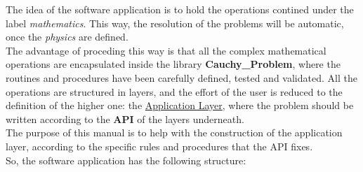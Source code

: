\vspace{1cm}

The idea of the software application is to hold the operations contined under
the label \textit{mathematics}. This way, the resolution of the problems will be
automatic, once the \textit{physics} are defined. \\

The advantage of proceding this way is that all the complex mathematical
operations are encapsulated inside the library \textbf{Cauchy\_Problem}, where
the routines and procedures have been carefully defined, tested and validated.
All the operations are structured in layers, and the effort of the user
is reduced to the definition of the higher one: the \underline{Application
Layer}, where the problem should be written according to the \textbf{API} of
the layers underneath.\\

The purpose of this manual is to help with the construction of the application layer, according to the specific rules and
procedures that the API fixes. \\

So, the software application has the following structure: \\

